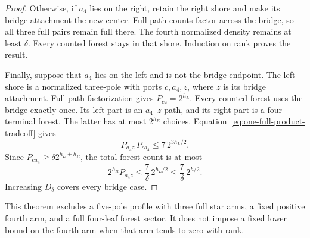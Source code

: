 \begin{proof}
Otherwise, if $a_4$ lies on the right, retain the right shore and make its bridge attachment the new center.
Full path counts factor across the bridge, so all three full pairs remain full there.
The fourth normalized density remains at least $\delta$.
Every counted forest stays in that shore.
Induction on rank proves the result.

Finally, suppose that $a_4$ lies on the left and is not the bridge endpoint.
The left shore is a normalized three-pole with ports $c,a_4,z$, where $z$ is its bridge attachment.
Full path factorization gives $P_{cz}=2^{h_L}$.
Every counted forest uses the bridge exactly once.
Its left part is an $a_4$--$z$ path, and its right part is a four-terminal forest.
The latter has at most $2^{h_R}$ choices.
Equation~\eqref{eq:one-full-product-tradeoff} gives
\[
 P_{a_4z}\,P_{ca_4}\le7\,2^{3h_L/2}.
\]
Since $P_{ca_4}\ge\delta2^{h_L+h_R}$, the total forest count is at most
\[
 2^{h_R}P_{a_4z}
 \le\frac7\delta\,2^{h_L/2}
 \le\frac7\delta\,2^{h/2}.
\]
Increasing $D_\delta$ covers every bridge case.
\end{proof}

This theorem excludes a five-pole profile with three full star arms, a fixed positive fourth arm, and a full four-leaf forest sector.
It does not impose a fixed lower bound on the fourth arm when that arm tends to zero with rank.

